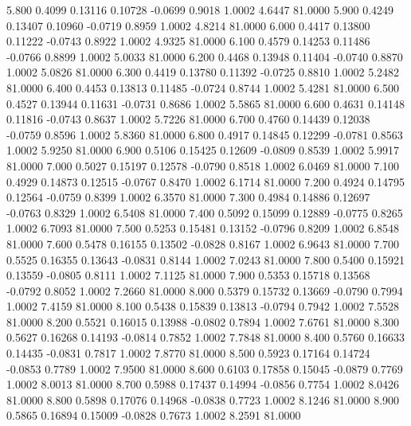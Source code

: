    5.800   0.4099   0.13116   0.10728  -0.0699   0.9018   1.0002   4.6447  81.0000
   5.900   0.4249   0.13407   0.10960  -0.0719   0.8959   1.0002   4.8214  81.0000
   6.000   0.4417   0.13800   0.11222  -0.0743   0.8922   1.0002   4.9325  81.0000
   6.100   0.4579   0.14253   0.11486  -0.0766   0.8899   1.0002   5.0033  81.0000
   6.200   0.4468   0.13948   0.11404  -0.0740   0.8870   1.0002   5.0826  81.0000
   6.300   0.4419   0.13780   0.11392  -0.0725   0.8810   1.0002   5.2482  81.0000
   6.400   0.4453   0.13813   0.11485  -0.0724   0.8744   1.0002   5.4281  81.0000
   6.500   0.4527   0.13944   0.11631  -0.0731   0.8686   1.0002   5.5865  81.0000
   6.600   0.4631   0.14148   0.11816  -0.0743   0.8637   1.0002   5.7226  81.0000
   6.700   0.4760   0.14439   0.12038  -0.0759   0.8596   1.0002   5.8360  81.0000
   6.800   0.4917   0.14845   0.12299  -0.0781   0.8563   1.0002   5.9250  81.0000
   6.900   0.5106   0.15425   0.12609  -0.0809   0.8539   1.0002   5.9917  81.0000
   7.000   0.5027   0.15197   0.12578  -0.0790   0.8518   1.0002   6.0469  81.0000
   7.100   0.4929   0.14873   0.12515  -0.0767   0.8470   1.0002   6.1714  81.0000
   7.200   0.4924   0.14795   0.12564  -0.0759   0.8399   1.0002   6.3570  81.0000
   7.300   0.4984   0.14886   0.12697  -0.0763   0.8329   1.0002   6.5408  81.0000
   7.400   0.5092   0.15099   0.12889  -0.0775   0.8265   1.0002   6.7093  81.0000
   7.500   0.5253   0.15481   0.13152  -0.0796   0.8209   1.0002   6.8548  81.0000
   7.600   0.5478   0.16155   0.13502  -0.0828   0.8167   1.0002   6.9643  81.0000
   7.700   0.5525   0.16355   0.13643  -0.0831   0.8144   1.0002   7.0243  81.0000
   7.800   0.5400   0.15921   0.13559  -0.0805   0.8111   1.0002   7.1125  81.0000
   7.900   0.5353   0.15718   0.13568  -0.0792   0.8052   1.0002   7.2660  81.0000
   8.000   0.5379   0.15732   0.13669  -0.0790   0.7994   1.0002   7.4159  81.0000
   8.100   0.5438   0.15839   0.13813  -0.0794   0.7942   1.0002   7.5528  81.0000
   8.200   0.5521   0.16015   0.13988  -0.0802   0.7894   1.0002   7.6761  81.0000
   8.300   0.5627   0.16268   0.14193  -0.0814   0.7852   1.0002   7.7848  81.0000
   8.400   0.5760   0.16633   0.14435  -0.0831   0.7817   1.0002   7.8770  81.0000
   8.500   0.5923   0.17164   0.14724  -0.0853   0.7789   1.0002   7.9500  81.0000
   8.600   0.6103   0.17858   0.15045  -0.0879   0.7769   1.0002   8.0013  81.0000
   8.700   0.5988   0.17437   0.14994  -0.0856   0.7754   1.0002   8.0426  81.0000
   8.800   0.5898   0.17076   0.14968  -0.0838   0.7723   1.0002   8.1246  81.0000
   8.900   0.5865   0.16894   0.15009  -0.0828   0.7673   1.0002   8.2591  81.0000
